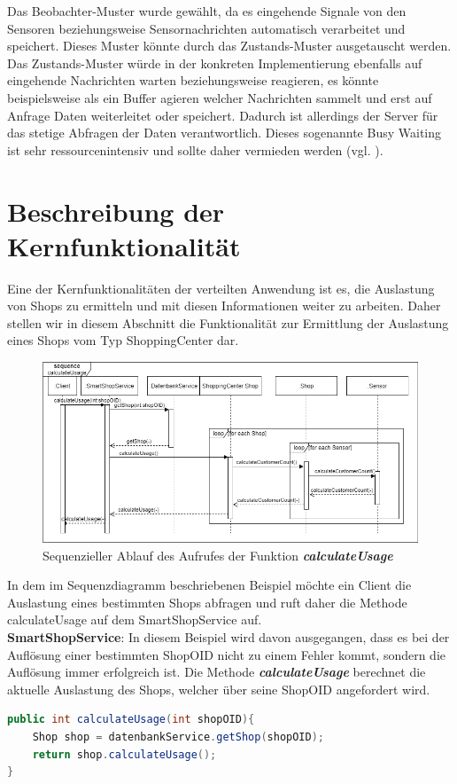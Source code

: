 \documentclass[runningheads]{llncs}
\begin{document}
Das Beobachter-Muster wurde gewählt, da es eingehende Signale von den Sensoren beziehungsweise Sensornachrichten automatisch verarbeitet und speichert.
Dieses Muster könnte durch das Zustands-Muster ausgetauscht werden.
Das Zustands-Muster würde in der konkreten Implementierung ebenfalls auf eingehende Nachrichten warten beziehungsweise reagieren, es könnte beispielsweise als ein Buffer agieren welcher Nachrichten sammelt und erst auf Anfrage Daten weiterleitet oder speichert.
Dadurch ist allerdings der Server für das stetige Abfragen der Daten verantwortlich.
Dieses sogenannte Busy Waiting ist sehr ressourcenintensiv und sollte daher vermieden werden (vgl. \cite{RJ2021}).

\newpage
\section{Beschreibung der Kernfunktionalität}
Eine der Kernfunktionalitäten der verteilten Anwendung ist es, die Auslastung von Shops zu ermitteln und mit diesen Informationen weiter zu arbeiten.
Daher stellen wir in diesem Abschnitt die Funktionalität zur Ermittlung der Auslastung eines Shops vom Typ ShoppingCenter dar.

\begin{figure}
	\includegraphics[width=\linewidth]{images/Sequenzdiagramm}
	\caption{Sequenzieller Ablauf des Aufrufes der Funktion \textbf{\textit{calculateUsage}}}
\end{figure}

In dem im Sequenzdiagramm beschriebenen Beispiel möchte ein Client die Auslastung eines bestimmten Shops abfragen und ruft daher die Methode calculateUsage auf dem SmartShopService auf.
\\

\textbf{SmartShopService}: In diesem Beispiel wird davon ausgegangen, dass es bei der Auflösung einer bestimmten ShopOID nicht zu einem Fehler kommt, sondern die Auflösung immer erfolgreich ist.
Die Methode \textbf{\textit{calculateUsage}} berechnet die aktuelle Auslastung des Shops, welcher über seine ShopOID angefordert wird.
\begin{lstlisting}[language=Java, basicstyle=\scriptsize]
public int calculateUsage(int shopOID){
	Shop shop = datenbankService.getShop(shopOID);
	return shop.calculateUsage();
}
\end{lstlisting}
\end{document}
